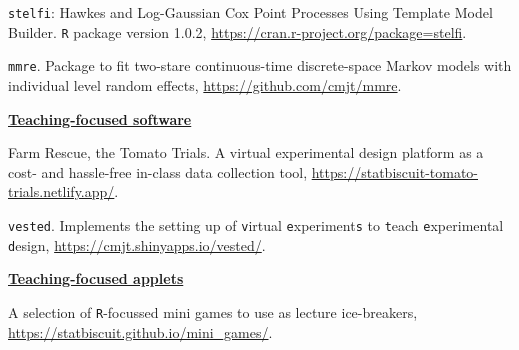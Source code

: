 \documentclass[10pt,a4paper]{moderncv}
\begin{document}
\texttt{stelfi}: Hawkes and Log-Gaussian Cox Point Processes Using Template Model Builder. \texttt{R} package version 1.0.2, \url{https://cran.r-project.org/package=stelfi}.\\

\vspace{-3pt}

\texttt{mmre}. Package to fit two-stare continuous-time discrete-space Markov models with individual level random effects, \url{https://github.com/cmjt/mmre}.\\






\vspace{2pt}

\underline{\textbf{Teaching-focused software}}\\
\vspace{-3pt}

Farm Rescue, the Tomato Trials. A virtual experimental design platform as a cost- and hassle-free in-class data collection tool, \url{https://statbiscuit-tomato-trials.netlify.app/}.\\

\vspace{-3pt}

\texttt{vested}. Implements the setting up of \texttt{v}irtual \texttt{e}xperiment\texttt{s} to \texttt{t}each \texttt{e}xperimental \texttt{d}esign, \url{https://cmjt.shinyapps.io/vested/}.\\

\vspace{2pt}

\underline{\textbf{Teaching-focused applets}}\\
\vspace{-3pt}

A selection of \texttt{R}-focussed mini games to use as lecture ice-breakers, \url{https://statbiscuit.github.io/mini_games/}.\\

\vspace{-3pt}
\end{document}

